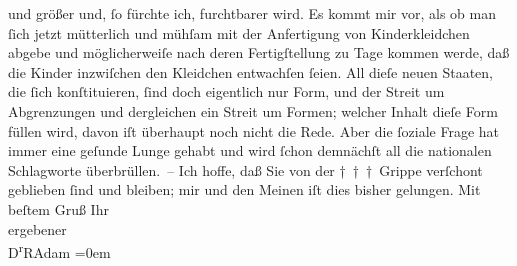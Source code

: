 \begin{ledgroupsized}[t]{13cm}
               und größer und, ſo fürchte ich, furchtbarer wird. Es kommt mir vor, als ob man ſich
               jetzt mütterlich und mühſam mit der Anfertigung von Kinderkleidchen abgebe und
               möglicherweiſe nach deren Fertigſtellung zu Tage kommen werde, daß die Kinder
               inzwiſchen  den Kleidchen
               entwachſen ſeien. All dieſe neuen Staaten, die ſich konſtituieren, ſind doch
               eigentlich nur Form, und der Streit um Abgrenzungen und dergleichen ein Streit um
               Formen; welcher Inhalt dieſe Form füllen wird, davon iſt überhaupt noch nicht die
               Rede. Aber {\pb}die ſoziale Frage hat immer
               eine geſunde Lunge gehabt und wird ſchon demnächſt all die nationalen Schlagworte
               überbrüllen. –\pend
           \pstart
           Ich hoffe, daß Sie von der † † † Grippe verſchont geblieben ſind und bleiben; mir und
               den Meinen iſt dies bisher gelungen.\pend
           \pstart
           Mit beſtem Gruß Ihr{\\[\baselineskip]}ergebener{\\[\baselineskip]}\spacefill\mbox{D\textsuperscript{r}RAdam}\pend
           \leftskip=0em{}
         
         \endnumbering{}\end{ledgroupsized}  \newcommand{\dateiname}{L02308}\newcommand{\titel}{Robert Adam an Arthur Schnitzler, 25. 10. 1918}\newcommand{\editorInnen}{Martin Anton Müller und Gerd-Hermann Susen}
      